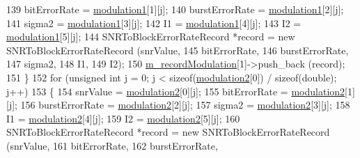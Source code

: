 \begin{DoxyCode}
139       bitErrorRate = \hyperlink{classns3_1_1SNRToBlockErrorRateManager_a748cc86d24982cdcab55497c0813d249}{modulation1}[1][j];
140       burstErrorRate = \hyperlink{classns3_1_1SNRToBlockErrorRateManager_a748cc86d24982cdcab55497c0813d249}{modulation1}[2][j];
141       sigma2 = \hyperlink{classns3_1_1SNRToBlockErrorRateManager_a748cc86d24982cdcab55497c0813d249}{modulation1}[3][j];
142       I1 = \hyperlink{classns3_1_1SNRToBlockErrorRateManager_a748cc86d24982cdcab55497c0813d249}{modulation1}[4][j];
143       I2 = \hyperlink{classns3_1_1SNRToBlockErrorRateManager_a748cc86d24982cdcab55497c0813d249}{modulation1}[5][j];
144       SNRToBlockErrorRateRecord *record = \textcolor{keyword}{new} SNRToBlockErrorRateRecord (snrValue,
145                                                                          bitErrorRate,
146                                                                          burstErrorRate,
147                                                                          sigma2,
148                                                                          I1,
149                                                                          I2);
150       \hyperlink{classns3_1_1SNRToBlockErrorRateManager_af74c812f3b0a25252f2897aadea6898e}{m\_recordModulation}[1]->push\_back (record);
151     \}
152   \textcolor{keywordflow}{for} (\textcolor{keywordtype}{unsigned} \textcolor{keywordtype}{int} j = 0; j < \textcolor{keyword}{sizeof}(\hyperlink{classns3_1_1SNRToBlockErrorRateManager_adcc1f71f0e96746552c6d3269dc1889a}{modulation2}[0]) / \textcolor{keyword}{sizeof}(\textcolor{keywordtype}{double}); j++)
153     \{
154       snrValue = \hyperlink{classns3_1_1SNRToBlockErrorRateManager_adcc1f71f0e96746552c6d3269dc1889a}{modulation2}[0][j];
155       bitErrorRate = \hyperlink{classns3_1_1SNRToBlockErrorRateManager_adcc1f71f0e96746552c6d3269dc1889a}{modulation2}[1][j];
156       burstErrorRate = \hyperlink{classns3_1_1SNRToBlockErrorRateManager_adcc1f71f0e96746552c6d3269dc1889a}{modulation2}[2][j];
157       sigma2 = \hyperlink{classns3_1_1SNRToBlockErrorRateManager_adcc1f71f0e96746552c6d3269dc1889a}{modulation2}[3][j];
158       I1 = \hyperlink{classns3_1_1SNRToBlockErrorRateManager_adcc1f71f0e96746552c6d3269dc1889a}{modulation2}[4][j];
159       I2 = \hyperlink{classns3_1_1SNRToBlockErrorRateManager_adcc1f71f0e96746552c6d3269dc1889a}{modulation2}[5][j];
160       SNRToBlockErrorRateRecord *record = \textcolor{keyword}{new} SNRToBlockErrorRateRecord (snrValue,
161                                                                          bitErrorRate,
162                                                                          burstErrorRate,

\end{DoxyCode}
